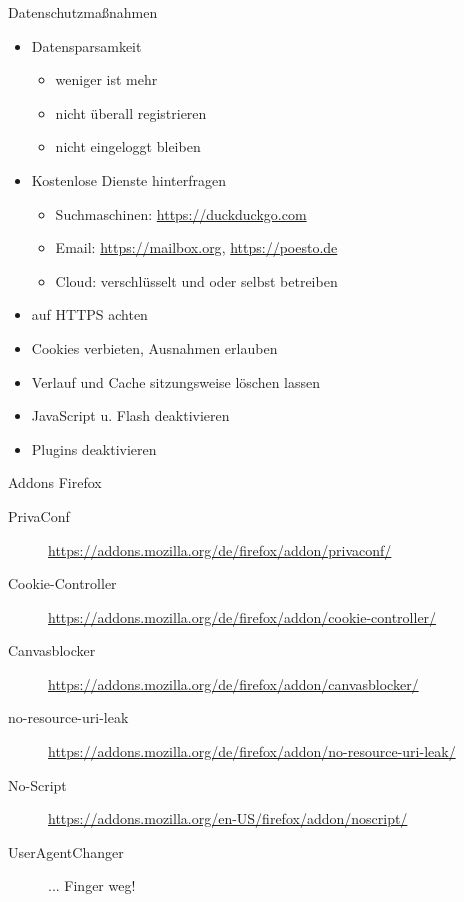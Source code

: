 \documentclass[hyperref={colorlinks,linkcolor=white}, utf8]{beamer}
\begin{document}
	\begin{frame}{Datenschutzmaßnahmen}
		\begin{itemize}
			\item Datensparsamkeit
			\begin{itemize}
				\item weniger ist mehr
				\item nicht überall registrieren
				\item nicht eingeloggt bleiben
			\end{itemize}
			\item Kostenlose Dienste hinterfragen
			\begin{itemize}
				\item Suchmaschinen: \url{https://duckduckgo.com}
				\item Email: \url{https://mailbox.org}, \url{https://poesto.de}
				\item Cloud: verschlüsselt und oder selbst betreiben
			\end{itemize}
			\item auf HTTPS achten
			\item Cookies verbieten, Ausnahmen erlauben
			\item Verlauf und Cache sitzungsweise löschen lassen
			\item JavaScript u. Flash deaktivieren
			\item Plugins deaktivieren
		\end{itemize}
	\end{frame}
	
	\begin{frame}{Addons Firefox}
		\noindent
		\begin{description}
			\item[PrivaConf] \url{https://addons.mozilla.org/de/firefox/addon/privaconf/}
			\item[Cookie-Controller] \url{https://addons.mozilla.org/de/firefox/addon/cookie-controller/}
			\item[Canvasblocker] \url{https://addons.mozilla.org/de/firefox/addon/canvasblocker/}
			\item[no-resource-uri-leak] \url{https://addons.mozilla.org/de/firefox/addon/no-resource-uri-leak/}
			\item[No-Script] \url{https://addons.mozilla.org/en-US/firefox/addon/noscript/}
			\item[UserAgentChanger]{... Finger weg!}
		\end{description}
	\end{frame}
	
\end{document}
